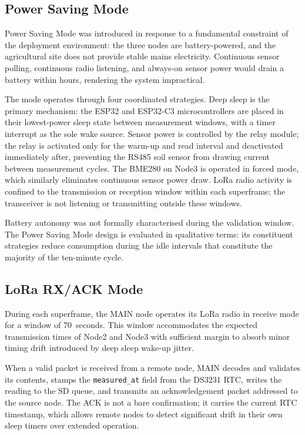 \subsection{Power Saving Mode}
\label{sec:mode-power-saving}

Power Saving Mode was introduced in response to a fundamental constraint of the deployment environment: the three nodes are battery-powered, and the agricultural site does not provide stable mains electricity. Continuous sensor polling, continuous radio listening, and always-on sensor power would drain a battery within hours, rendering the system impractical.

The mode operates through four coordinated strategies. Deep sleep is the primary mechanism: the ESP32 and ESP32-C3 microcontrollers are placed in their lowest-power sleep state between measurement windows, with a timer interrupt as the sole wake source. Sensor power is controlled by the relay module; the relay is activated only for the warm-up and read interval and deactivated immediately after, preventing the RS485 soil sensor from drawing current between measurement cycles. The BME280 on Node3 is operated in forced mode, which similarly eliminates continuous sensor power draw. LoRa radio activity is confined to the transmission or reception window within each superframe; the transceiver is not listening or transmitting outside these windows.

Battery autonomy was not formally characterised during the validation window. The Power Saving Mode design is evaluated in qualitative terms: its constituent strategies reduce consumption during the idle intervals that constitute the majority of the ten-minute cycle.

\subsection{LoRa RX/ACK Mode}
\label{sec:mode-lora-ack}

During each superframe, the MAIN node operates its LoRa radio in receive mode for a window of 70~seconds. This window accommodates the expected transmission times of Node2 and Node3 with sufficient margin to absorb minor timing drift introduced by deep sleep wake-up jitter.

When a valid packet is received from a remote node, MAIN decodes and validates its contents, stamps the \texttt{measured\_at} field from the DS3231 RTC, writes the reading to the SD queue, and transmits an acknowledgement packet addressed to the source node. The ACK is not a bare confirmation; it carries the current RTC timestamp, which allows remote nodes to detect significant drift in their own sleep timers over extended operation.

